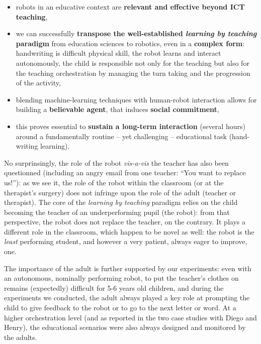 \documentclass{article}
\begin{document}
\begin{itemize}
    \item robots in an educative context are \textbf{relevant and effective beyond ICT
        teaching},

    \item we can successfully \textbf{transpose the well-established
        \emph{learning by teaching} paradigm} from education sciences to
        robotics, even in a \textbf{complex form}: handwriting is difficult
        physical skill, the robot learns and interact autonomously, the child is
        responsible not only for the teaching but also for the teaching
        orchestration by managing the turn taking and the progression of the
        activity,

    \item blending machine-learning techniques with human-robot interaction
        allows for building a \textbf{believable agent}, that induces
        \textbf{social commitment},

    \item this proves essential to \textbf{sustain a long-term interaction} (several
        hours) around a fundamentally routine -- yet challenging -- educational
        task (hand-writing learning).
\end{itemize}


No surprinsingly, the role of the robot \textit{vis-a-vis} the teacher has also
been questionned (including an angry email from one teacher: ``You want to
replace us!''): as we see it, the role of the robot within the classroom (or at
the therapist's surgery) does not infringe upon the role of the adult (teacher
or therapist).  The core of the \emph{learning by teaching} paradigm relies on
the child becoming the teacher of an underperforming pupil (the robot): from
that perspective, the robot does not replace the teacher, on the contrary. It
plays a different role in the classroom, which happen to be novel as well: the
robot is the \emph{least} performing student, and however a very patient, always
eager to improve, one.

The importance of the adult is further supported by our experiments: even with
an autonomous, nominally performing robot, to put the teacher's clothes on
remains (expectedly) difficult for 5-6 years old children, and during the
experiments we conducted, the adult always played a key role at prompting the
child to give feedback to the robot or to go to the next letter or word.  At a
higher orchestration level (and as reported in the two case studies with Diego
and Henry), the educational scenarios were also always designed and monitored by
the adults.
\end{document}

